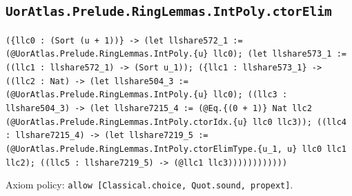 \documentclass[11pt]{article}
\begin{document}
\subsection*{\texttt{UorAtlas.Prelude.RingLemmas.IntPoly.ctorElim}}
\noindent\texttt{(\{llc0 : (Sort (u + 1))\} -> (let llshare572\_1 := (@UorAtlas.Prelude.RingLemmas.IntPoly.\{u\} llc0); (let llshare573\_1 := ((llc1 : llshare572\_1) -> (Sort u\_1)); (\{llc1 : llshare573\_1\} -> ((llc2 : Nat) -> (let llshare504\_3 := (@UorAtlas.Prelude.RingLemmas.IntPoly.\{u\} llc0); ((llc3 : llshare504\_3) -> (let llshare7215\_4 := (@Eq.\{(0 + 1)\} Nat llc2 (@UorAtlas.Prelude.RingLemmas.IntPoly.ctorIdx.\{u\} llc0 llc3)); ((llc4 : llshare7215\_4) -> (let llshare7219\_5 := (@UorAtlas.Prelude.RingLemmas.IntPoly.ctorElimType.\{u\_1, u\} llc0 llc1 llc2); ((llc5 : llshare7219\_5) -> (@llc1 llc3))))))))))))}\par
\noindent Axiom policy: \texttt{allow [Classical.choice, Quot.sound, propext]}.\par
\end{document}
